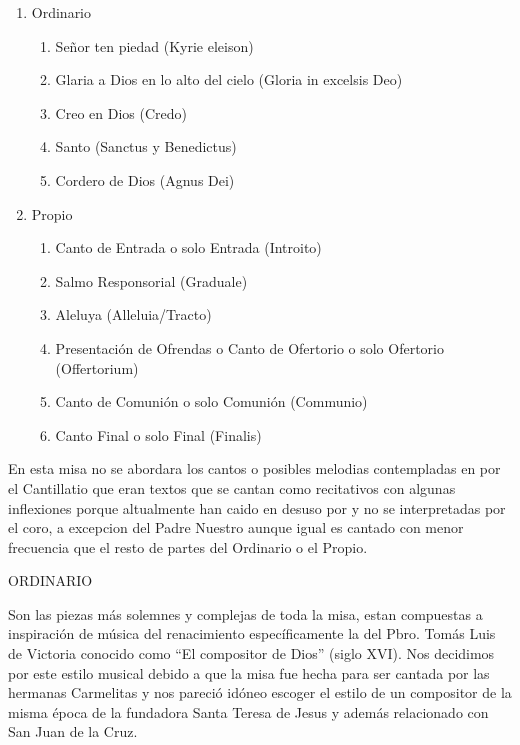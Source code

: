 \documentclass[12pt, letterpaper]{report}
\begin{document}
    \renewcommand{\theenumi}{\arabic{enumi}}
    \begin{enumerate}
        \item Ordinario
        \begin{enumerate}
            \item Se\~nor ten piedad (Kyrie eleison)
            \item Glaria a Dios en lo alto del cielo (Gloria in excelsis Deo)
            \item Creo en Dios (Credo)
            \item Santo (Sanctus y Benedictus)
            \item Cordero de Dios (Agnus Dei)
        \end{enumerate}

        \item Propio
        \begin{enumerate}
            \item Canto de Entrada o solo Entrada (Introito)
            \item Salmo Responsorial (Graduale)
            \item Aleluya (Alleluia/Tracto)
            \item Presentaci\'on de Ofrendas o Canto de Ofertorio o solo Ofertorio (Offertorium)
            \item Canto de Comuni\'on o solo Comuni\'on (Communio)
            \item Canto Final o solo Final (Finalis)
        \end{enumerate}
    \end{enumerate}

    En esta misa no se abordara los cantos o posibles melodias contempladas en por el Cantillatio que eran textos que se cantan como recitativos con algunas inflexiones porque altualmente han caido en desuso por y no se interpretadas por el coro, a excepcion del Padre Nuestro aunque igual es cantado con menor frecuencia que el resto de partes del Ordinario o el Propio.

    \LARGE ORDINARIO

    \Large Son las piezas m\'as solemnes y complejas de toda la misa, estan compuestas a inspiraci\'on de m\'usica del renacimiento espec\'ificamente la del Pbro. Tom\'as Luis de Victoria conocido como ``El compositor de Dios'' (siglo XVI). Nos decidimos por este estilo musical debido a que la misa fue hecha para ser cantada por las hermanas Carmelitas y nos pareci\'o id\'oneo escoger el estilo de un compositor de la misma \'epoca de la fundadora Santa Teresa de Jesus y adem\'as relacionado con San Juan de la Cruz.
\end{document}
